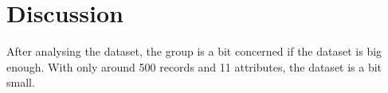 \section{Discussion}
After analysing the dataset, the group is a bit concerned if the dataset is big enough. With only around 500 records and 11 attributes, the dataset is a bit small.